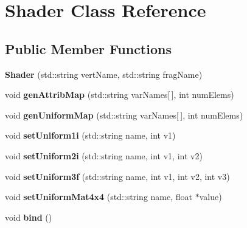 \hypertarget{class_shader}{\section{Shader Class Reference}
\label{class_shader}
}
\subsection*{Public Member Functions}
\begin{DoxyCompactItemize}
\item 
\hypertarget{class_shader_a5786f696ba39232cb732542aed798e82}{{\bfseries Shader} (std\-::string vert\-Name, std\-::string frag\-Name)}\label{class_shader_a5786f696ba39232cb732542aed798e82}

\item 
\hypertarget{class_shader_a0f03ffd9d463b2967b8db23006c73679}{void {\bfseries gen\-Attrib\-Map} (std\-::string var\-Names\mbox{[}$\,$\mbox{]}, int num\-Elems)}\label{class_shader_a0f03ffd9d463b2967b8db23006c73679}

\item 
\hypertarget{class_shader_a08a774e014a5ad959c06378749bce856}{void {\bfseries gen\-Uniform\-Map} (std\-::string var\-Names\mbox{[}$\,$\mbox{]}, int num\-Elems)}\label{class_shader_a08a774e014a5ad959c06378749bce856}

\item 
\hypertarget{class_shader_a0d5c21c96edd9c67599d26131251c5d3}{void {\bfseries set\-Uniform1i} (std\-::string name, int v1)}\label{class_shader_a0d5c21c96edd9c67599d26131251c5d3}

\item 
\hypertarget{class_shader_a54c535a7b501c40c3ae2b7b1dad80000}{void {\bfseries set\-Uniform2i} (std\-::string name, int v1, int v2)}\label{class_shader_a54c535a7b501c40c3ae2b7b1dad80000}

\item 
\hypertarget{class_shader_ac989220e264c97a494ae66bb888eb60c}{void {\bfseries set\-Uniform3f} (std\-::string name, int v1, int v2, int v3)}\label{class_shader_ac989220e264c97a494ae66bb888eb60c}

\item 
\hypertarget{class_shader_a2737cc648540a20b1aae2bb9ee379b17}{void {\bfseries set\-Uniform\-Mat4x4} (std\-::string name, float $\ast$value)}\label{class_shader_a2737cc648540a20b1aae2bb9ee379b17}

\item 
\hypertarget{class_shader_a6f6e280a343d6c7662909f7dfbc89ad9}{void {\bfseries bind} ()}\label{class_shader_a6f6e280a343d6c7662909f7dfbc89ad9}


\end{DoxyCompactItemize}
